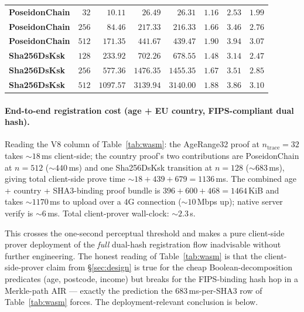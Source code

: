 \documentclass[11pt,a4paper]{article}
\begin{document}
\begin{table}[h]
\begin{tabular}{l r r r r r r r}
    \midrule
    \textbf{PoseidonChain} &  $32$ &  $10.11$ &  $26.49$ &  $26.31$ & $1.16$ & $2.53$ & $1.99$ \\
    \textbf{PoseidonChain} & $256$ &  $84.46$ & $217.33$ & $216.33$ & $1.66$ & $3.46$ & $2.76$ \\
    \textbf{PoseidonChain} & $512$ & $\mathbf{171.35}$ & $\mathbf{441.67}$ & $\mathbf{439.47}$ & $\mathbf{1.90}$ & $\mathbf{3.94}$ & $\mathbf{3.07}$ \\
    \midrule
    \textbf{Sha256DsKsk} & $128$ & $\mathbf{233.92}$ & $\mathbf{702.26}$ & $\mathbf{678.55}$ & $\mathbf{1.48}$ & $\mathbf{3.14}$ & $\mathbf{2.47}$ \\
    \textbf{Sha256DsKsk} & $256$ & $577.36$ & $1476.35$ & $1455.35$ & $1.67$ & $3.51$ & $2.85$ \\
    \textbf{Sha256DsKsk} & $512$ & $1097.57$ & $3139.94$ & $3140.00$ & $1.88$ & $3.86$ & $3.10$ \\
    \bottomrule
  \end{tabular}
\end{table}

\paragraph{End\nobreakdash-to\nobreakdash-end registration cost
(age + EU country, FIPS\nobreakdash-compliant
dual hash).}  Reading the V8 column of Table~\ref{tab:wasm}: the
AgeRange32 proof at $n_\mathrm{trace} = 32$ takes
$\sim\!\num{18}$\,ms client\nobreakdash-side; the country
proof's two contributions are PoseidonChain at $n=512$
($\sim\!\num{440}$\,ms) and one Sha256DsKsk transition at
$n=128$ ($\sim\!\num{683}$\,ms), giving total
client\nobreakdash-side prove time
$\sim\!\num{18} + \num{439} + \num{679} = \num{1136}$\,ms.  The
combined age + country + SHA3\nobreakdash-binding proof bundle is
$\num{396} + \num{600} + \num{468} = \num{1464}$\,KiB and takes
$\sim\!\num{1170}$\,ms to upload over a $4$G connection
($\sim\!10$\,Mbps up); native server verify is $\sim\!\num{6}$\,ms.
Total client\nobreakdash-prover wall\nobreakdash-clock:
$\sim\!\num{2.3}$\,s.

This crosses the one\nobreakdash-second perceptual threshold and
makes a pure client\nobreakdash-side prover deployment of the
\emph{full} dual\nobreakdash-hash registration flow inadvisable
without further engineering.  The honest reading of
Table~\ref{tab:wasm} is that the
client\nobreakdash-side\nobreakdash-prover claim from
\S\ref{sec:design} is true for the cheap
Boolean\nobreakdash-decomposition predicates (age, postcode,
income) but breaks for the FIPS\nobreakdash-binding hash hop in a
Merkle\nobreakdash-path AIR — exactly the prediction the
$\num{683}$\,ms\nobreakdash-per\nobreakdash-SHA3 row of
Table~\ref{tab:wasm} forces.  The
deployment\nobreakdash-relevant conclusion is below.
\end{document}
